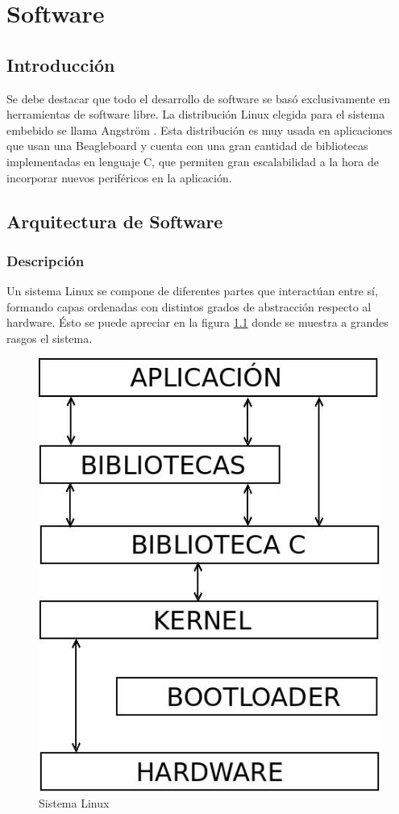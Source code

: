 \chapter{Software}

\section{Introducción}
Se debe destacar que todo el desarrollo de software se basó exclusivamente en herramientas de software libre. La distribución Linux elegida para el sistema embebido se llama Angström \cite{Angs}. Esta distribución es muy usada en aplicaciones que usan una Beagleboard y cuenta con una gran cantidad de bibliotecas implementadas en lenguaje C, que permiten gran escalabilidad a la hora de incorporar nuevos periféricos en la aplicación.

\section{Arquitectura de Software}
\subsection{Descripción}
Un sistema Linux se compone de diferentes partes que interactúan entre sí, formando capas ordenadas con distintos grados de abstracción respecto al hardware. Ésto se puede apreciar en la figura \ref{Fig:SisLinux} donde se muestra a grandes rasgos el sistema. 

\begin{figure}[H]
\centering
  \begin{center}
  \includegraphics[scale=.4]{Imagenes/SisLinux.jpg} 
  \end{center}
  \caption{Sistema Linux}\label{Fig:SisLinux} 
\end{figure}


